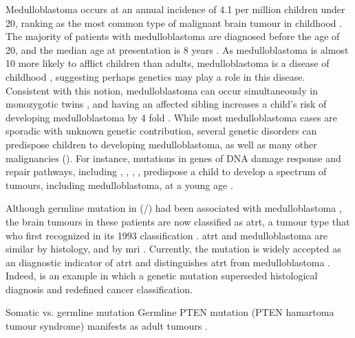 Medulloblastoma occurs at an annual incidence of 4.1 per million children under 20, ranking as the most common type of malignant brain tumour in childhood . The majority of patients with medulloblastoma are diagnosed before the age of 20, and the median age at presentation is 8 years . As medulloblastoma is almost 10 more likely to afflict children than adults, medulloblastoma is a disease of childhood , suggesting perhaps genetics may play a role in this disease. Consistent with this notion, medulloblastoma can occur simultaneously in monozygotic twins , and having an affected sibling increases a child's risk of developing medulloblastoma by 4 fold . While most medulloblastoma cases are sporadic with unknown genetic contribution, several genetic disorders can predispose children to developing medulloblastoma, as well as many other malignancies (). For instance, mutations in genes of DNA damage response and repair pathways, including , , , , predispose a child to develop a spectrum of tumours, including medulloblastoma, at a young age . 

Although germline mutation in  (/) had been associated with medulloblastoma , the brain tumours in these patients are now classified as \gls{atrt}, a tumour type that \gls{who} first recognized in its 1993 classification . \gls{atrt} and medulloblastoma are similar by histology, and by \gls{mri} . Currently, the  mutation is widely accepted as an diagnostic indicator of \gls{atrt} and distinguishes \gls{atrt} from medulloblastoma . Indeed,  is an example in which a genetic mutation superseded histological diagnosis and redefined cancer classification.



Somatic vs. germline mutation
Germline PTEN mutation (PTEN hamartoma tumour syndrome) manifests as adult tumours .

